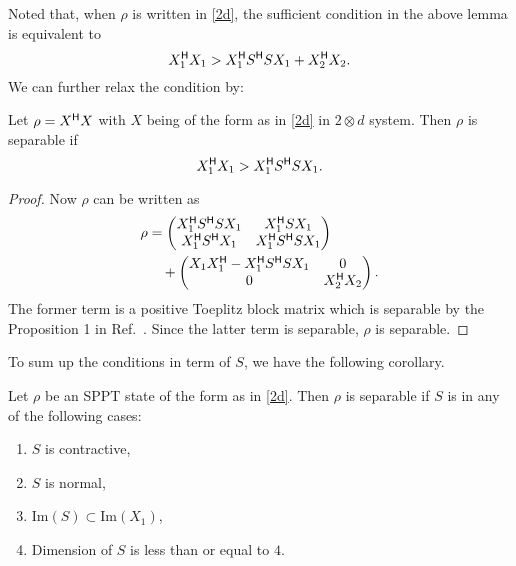   Noted that, when $\rho$ is written in \cref{2d}, the sufficient condition in the above lemma is equivalent to
  \begin{equation*}
    X_1^{\mathsf{H}}X_1 > X_1^{\mathsf{H}}S^{\mathsf{H}}SX_1 +X^{\mathsf{H}}_2X_2.
  \end{equation*}
  We can further relax the condition by:
  \begin{lem}
    Let $\rho=X^{\mathsf{H}}X$ with $X$ being of the form as in \cref{2d} in $2\otimes d$ system. Then $\rho$ is separable if
    \[X^{\mathsf{H}}_1 X_{1}> X^{\mathsf{H}}_1S^{\mathsf{H}} SX_1.\]
  \end{lem}
  \begin{proof}
    Now $\rho$ can be written as
    \begin{equation*}
      \begin{split}
        \rho & =
        \begin{pmatrix}
          X^{\mathsf{H}}_1 S^{\mathsf{H}}SX_1 & X^{\mathsf{H}}_1 S X_1\\
          X^{\mathsf{H}}_1 S^{\mathsf{H}} X_1 &            X^{\mathsf{H}}_1 S^{\mathsf{H}}SX_1 \\
        \end{pmatrix}
        \\
        &\quad+
        \begin{pmatrix}
          X_1X^{\mathsf{H}}_1 -     X^{\mathsf{H}}_1 S^{\mathsf{H}}SX_1 &0\\
          0 & X^{\mathsf{H}}_2 X_2\end{pmatrix}.
      \end{split}
    \end{equation*}
    The former term is a positive Toeplitz block matrix which is separable by the Proposition 1 in
    Ref.~\cite{Gurvits2002}. Since the latter term is separable, $\rho$ is separable.
  \end{proof}
  To sum up the conditions in term of $S$, we have the following corollary.
  \begin{corollary}
    Let $\rho$ be an SPPT state of the form as in \cref{2d}. Then $\rho$ is separable if $S$ is in any of the following cases:
    \begin{enumerate}
      \item $S$ is contractive,           
      \item $S$ is normal,
      \item $\mathrm{Im}(S)\subset \mathrm{Im}(X_1)$,
      \item Dimension of $S$ is  less than or equal to $4$.
    \end{enumerate}
  \end{corollary}

